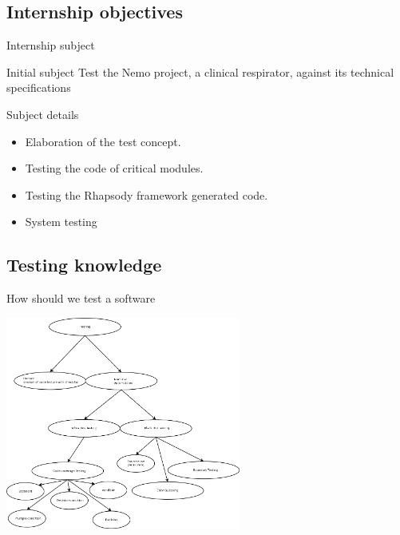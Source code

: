 \documentclass{beamer}
\begin{document}
\subsection{Internship objectives}
\begin{frame}{Internship subject}
  \begin{block}{Initial subject}
    \alert{Test the Nemo project, a clinical respirator, against its technical specifications}
  \end{block}
  \begin{block}{Subject details}
    \begin{itemize}
    \item<1-> Elaboration of the test concept.
    \item<2-> Testing the code of critical modules.
    \item<3-> Testing the Rhapsody framework generated code.
    \item<4-> System testing
    \end{itemize}
  \end{block}
\end{frame}

\subsection{Testing knowledge}

\begin{frame}{How should we test a software}
\begin{center}
\includegraphics[height=7cm]{img/SoftTesting.png}
\end{center}
\end{frame}
\end{document}
